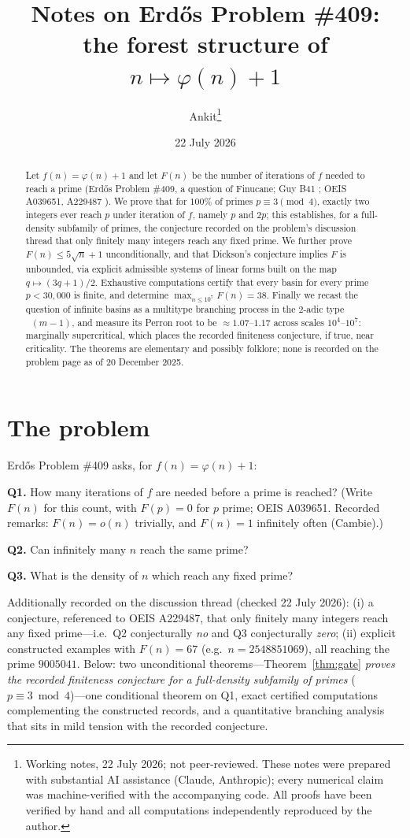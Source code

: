 \documentclass[11pt,a4paper]{article}
\title{Notes on Erd\H{o}s Problem \#409:\\ the forest structure of $n \mapsto \varphi(n)+1$}
\author{Ankit\thanks{Working notes, 22 July 2026; not peer-reviewed. These notes were prepared with substantial AI assistance (Claude, Anthropic); every numerical claim was machine-verified with the accompanying code. All proofs have been verified by hand and all computations independently reproduced by the author.}}
\date{22 July 2026}
\theoremstyle{remark}
\DeclareMathOperator{\vv}{v_2}
\begin{document}
\maketitle

\begin{abstract}
Let $f(n)=\varphi(n)+1$ and let $F(n)$ be the number of iterations of $f$ needed to reach a prime (Erd\H{o}s Problem \#409, a question of Finucane; Guy B41 \cite{Guy}; OEIS A039651, A229487 \cite{OEIS}). We prove that for $100\%$ of primes $p\equiv 3\pmod 4$, exactly two integers ever reach $p$ under iteration of $f$, namely $p$ and $2p$; this establishes, for a full-density subfamily of primes, the conjecture recorded on the problem's discussion thread that only finitely many integers reach any fixed prime. We further prove $F(n)\le 5\sqrt n+1$ unconditionally, and that Dickson's conjecture implies $F$ is unbounded, via explicit admissible systems of linear forms built on the map $q\mapsto(3q+1)/2$. Exhaustive computations certify that every basin for every prime $p<30{,}000$ is finite, and determine $\max_{n\le 10^7}F(n)=38$. Finally we recast the question of infinite basins as a multitype branching process in the $2$-adic type $\vv(m-1)$, and measure its Perron root to be $\approx 1.07$--$1.17$ across scales $10^4$--$10^7$: marginally supercritical, which places the recorded finiteness conjecture, if true, near criticality. The theorems are elementary and possibly folklore; none is recorded on the problem page as of 20 December 2025.
\end{abstract}

\section{The problem}

Erd\H{o}s Problem \#409 \cite{Bloom} asks, for $f(n)=\varphi(n)+1$:

\smallskip
\noindent\textbf{Q1.} How many iterations of $f$ are needed before a prime is reached? (Write $F(n)$ for this count, with $F(p)=0$ for $p$ prime; OEIS A039651. Recorded remarks: $F(n)=o(n)$ trivially, and $F(n)=1$ infinitely often (Cambie).)

\smallskip
\noindent\textbf{Q2.} Can infinitely many $n$ reach the same prime?

\smallskip
\noindent\textbf{Q3.} What is the density of $n$ which reach any fixed prime?

\smallskip
Additionally recorded on the discussion thread (checked 22 July 2026): (i) a conjecture, referenced to OEIS A229487, that only finitely many integers reach any fixed prime---i.e.\ Q2 conjecturally \emph{no} and Q3 conjecturally \emph{zero}; (ii) explicit constructed examples with $F(n)=67$ (e.g.\ $n=2548851069$), all reaching the prime $9005041$. Below: two unconditional theorems---Theorem~\ref{thm:gate} \emph{proves the recorded finiteness conjecture for a full-density subfamily of primes} ($p\equiv 3\bmod 4$)---one conditional theorem on Q1, exact certified computations complementing the constructed records, and a quantitative branching analysis that sits in mild tension with the recorded conjecture.
\end{document}
